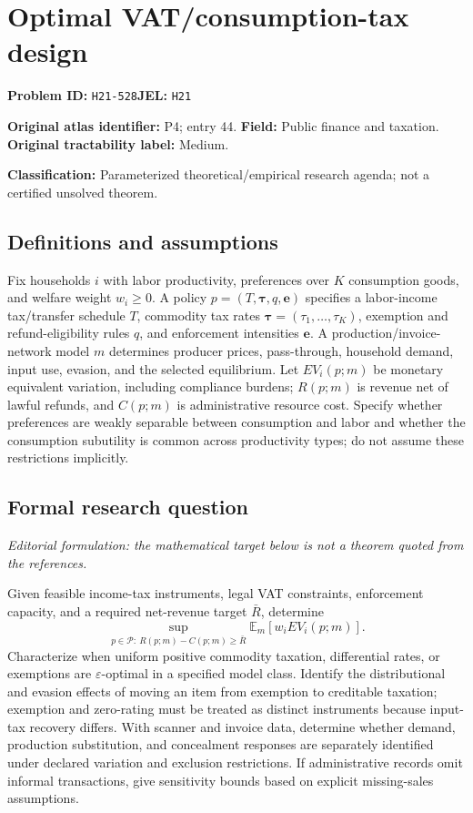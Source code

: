 \documentclass[11pt,a4paper]{article}
\begin{document}
\section*{Optimal VAT/consumption-tax design}
\textbf{Problem ID:} \texttt{H21-528}\quad \textbf{JEL:} \texttt{H21}\par
\label{problem:OP-0044}
\label{atlas:prob:P4}
\noindent\textbf{Original atlas identifier:} P4; entry 44. \textbf{Field:} Public finance and taxation. \textbf{Original tractability label:} Medium.

\noindent\textbf{Classification:} Parameterized theoretical/empirical research agenda; not a certified unsolved theorem.

\subsection*{Definitions and assumptions}
Fix households $i$ with labor productivity, preferences over $K$ consumption goods, and welfare weight $w_i\geq0$. A policy $p=(T,\boldsymbol\tau,q,\boldsymbol e)$ specifies a labor-income tax/transfer schedule $T$, commodity tax rates $\boldsymbol\tau=(\tau_1,\ldots,\tau_K)$, exemption and refund-eligibility rules $q$, and enforcement intensities $\boldsymbol e$. A production/invoice-network model $m$ determines producer prices, pass-through, household demand, input use, evasion, and the selected equilibrium. Let $EV_i(p;m)$ be monetary equivalent variation, including compliance burdens; $R(p;m)$ is revenue net of lawful refunds, and $C(p;m)$ is administrative resource cost. Specify whether preferences are weakly separable between consumption and labor and whether the consumption subutility is common across productivity types; do not assume these restrictions implicitly.

\subsection*{Formal research question}
\emph{Editorial formulation: the mathematical target below is not a theorem quoted from the references.}

Given feasible income-tax instruments, legal VAT constraints, enforcement capacity, and a required net-revenue target $\bar R$, determine
\[
 \sup_{p\in\mathcal P:\ R(p;m)-C(p;m)\geq\bar R}\mathbb E_m[w_iEV_i(p;m)].
\]
Characterize when uniform positive commodity taxation, differential rates, or exemptions are $\varepsilon$-optimal in a specified model class. Identify the distributional and evasion effects of moving an item from exemption to creditable taxation; exemption and zero-rating must be treated as distinct instruments because input-tax recovery differs. With scanner and invoice data, determine whether demand, production substitution, and concealment responses are separately identified under declared variation and exclusion restrictions. If administrative records omit informal transactions, give sensitivity bounds based on explicit missing-sales assumptions.
\end{document}
